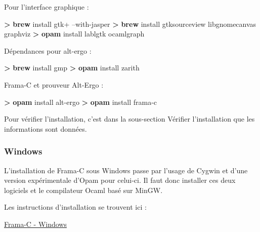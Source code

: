 \documentclass[12pt,francais,]{scrbook}
\newenvironment{Shaded}{}{}
\newcommand{\KeywordTok}[1]{\textcolor[rgb]{0.00,0.44,0.13}{\textbf{{#1}}}}
\newcommand{\NormalTok}[1]{{#1}}
\begin{document}
Pour l'interface graphique :

\begin{footnotesize}\begin{Shaded}
\begin{Highlighting}[]
\KeywordTok{>} \KeywordTok{brew} \NormalTok{install gtk+ --with-jasper}
\KeywordTok{>} \KeywordTok{brew} \NormalTok{install gtksourceview libgnomecanvas graphviz}
\KeywordTok{>} \KeywordTok{opam} \NormalTok{install lablgtk ocamlgraph }
\end{Highlighting}
\end{Shaded}\end{footnotesize}

Dépendances pour alt-ergo :

\begin{footnotesize}\begin{Shaded}
\begin{Highlighting}[]
\KeywordTok{>} \KeywordTok{brew} \NormalTok{install gmp}
\KeywordTok{>} \KeywordTok{opam} \NormalTok{install zarith}
\end{Highlighting}
\end{Shaded}\end{footnotesize}

Frama-C et prouveur Alt-Ergo :

\begin{footnotesize}\begin{Shaded}
\begin{Highlighting}[]
\KeywordTok{>} \KeywordTok{opam} \NormalTok{install alt-ergo}
\KeywordTok{>} \KeywordTok{opam} \NormalTok{install frama-c}
\end{Highlighting}
\end{Shaded}\end{footnotesize}

Pour vérifier l'installation, c'est dans la sous-section \og{}Vérifier
l'installation\fg{} que les informations sont données.

\subsubsection{Windows}\label{windows}

L'installation de Frama-C sous Windows passe par l'usage de Cygwin et
d'une version expérimentale d'Opam pour celui-ci. Il faut donc installer
ces deux logiciels et le compilateur Ocaml basé sur MinGW.

Les instructions d'installation se trouvent ici :

\href{https://bts.frama-c.com/dokuwiki/doku.php?id=mantis:frama-c:compiling_from_source}{Frama-C
- Windows}
\end{document}
